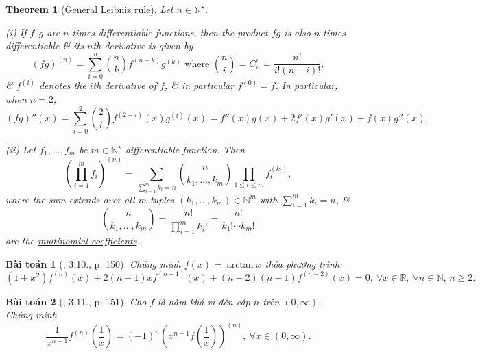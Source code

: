 \documentclass{article}
\newtheorem{baitoan}{Bài toán}
\newtheorem{theorem}{Theorem}
\begin{document}
\begin{theorem}[General Leibniz rule]
	Let $n\in\mathbb{N}^\star$.
	\item(i) If $f,g$ are $n$-times differentiable functions, then the product $fg$ is also $n$-times differentiable \& its $n$th derivative is given by
	\begin{equation*}
		(fg)^{(n)} = \sum_{i=0}^n \binom{n}{k}f^{(n-k)}g^{(k)}\mbox{ where }\binom{n}{i} = C_n^i = \frac{n!}{i!(n - i)!},
	\end{equation*}
	\& $f^{(i)}$ denotes the $i$th derivative of $f$, \& in particular $f^{(0)} = f$. In particular, when $n = 2$,
	\begin{equation*}
		(fg)''(x) = \sum_{i=0}^2 \binom{2}{i}f^{(2-i)}(x)g^{(i)}(x) = f''(x)g(x) + 2f'(x)g'(x) + f(x)g''(x).
	\end{equation*}
	\item(ii) Let $f_1,\ldots,f_m$ be $m\in\mathbb{N}^\star$ differentiable function. Then
	\begin{equation*}
		\left(\prod_{i=1}^m f_i\right)^{(n)} = \sum_{\sum_{i=1}^m k_i = n} \binom{n}{k_1,\ldots,k_m}\prod_{1\le t\le m} f_t^{(k_t)},
	\end{equation*}
	where the sum extends over all $m$-tuples $(k_1,\ldots,k_m)\in\mathbb{N}^m$ with $\sum_{i=1}^m k_i = n$, \&
	\begin{equation*}
		\binom{n}{k_1,\ldots,k_m} = \frac{n!}{\prod_{i=1}^m k_i!} = \frac{n!}{k_1!\cdots k_m!}
	\end{equation*}
	are the \href{https://en.wikipedia.org/wiki/Multinomial_coefficient}{multinomial coefficients}.
\end{theorem}

\begin{baitoan}[\cite{Quoc_Long_Dat_Nam_VMC}, 3.10., p. 150]
	Chứng minh $f(x) = \arctan x$ thỏa phương trình:
	\begin{equation*}
		(1 + x^2)f^{(n)}(x) + 2(n - 1)xf^{(n-1)}(x) + (n - 2)(n - 1)f^{(n-2)}(x) = 0,\ \forall x\in\mathbb{R},\ \forall n\in\mathbb{N},\,n\ge2.
	\end{equation*}
\end{baitoan}

\begin{baitoan}[\cite{Quoc_Long_Dat_Nam_VMC}, 3.11., p. 151]
	Cho $f$ là hàm khả vi đến cấp $n$ trên $(0,\infty)$. Chứng minh
	\begin{equation*}
		\frac{1}{x^{n+1}}f^{(n)}\left(\frac{1}{x}\right) = (-1)^n\left(x^{n-1}f\left(\frac{1}{x}\right)\right)^{(n)},\ \forall x\in(0,\infty).
	\end{equation*}
\end{baitoan}
\end{document}
